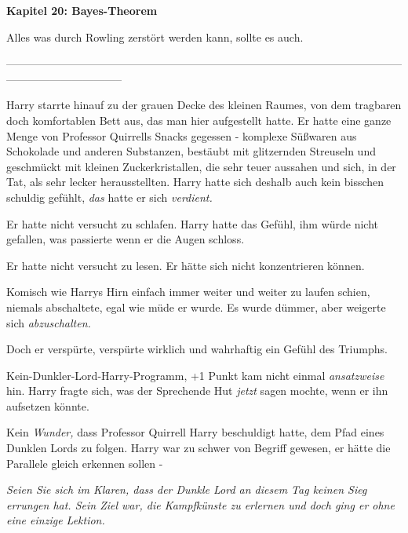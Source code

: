 

\hypertarget{bayes-theorem}{%

\textbf{Kapitel 20: Bayes-Theorem\\ }

Alles was durch Rowling zerstört werden kann, sollte es auch.

--------------------------------------------------------------------------------------------------------------------------------------------

Harry starrte hinauf zu der grauen Decke des kleinen Raumes, von dem tragbaren doch komfortablen Bett aus, das man hier aufgestellt hatte. Er hatte eine ganze Menge von Professor Quirrells Snacks gegessen - komplexe Süßwaren aus Schokolade und anderen Substanzen, bestäubt mit glitzernden Streuseln und geschmückt mit kleinen Zuckerkristallen, die sehr teuer aussahen und sich, in der Tat, als sehr lecker herausstellten. Harry hatte sich deshalb auch kein bisschen schuldig gefühlt, \emph{das} hatte er sich \emph{verdient.}

Er hatte nicht versucht zu schlafen. Harry hatte das Gefühl, ihm würde nicht gefallen, was passierte wenn er die Augen schloss.

Er hatte nicht versucht zu lesen. Er hätte sich nicht konzentrieren können.

Komisch wie Harrys Hirn einfach immer weiter und weiter zu laufen schien, niemals abschaltete, egal wie müde er wurde. Es wurde dümmer, aber weigerte sich \emph{abzuschalten.}

Doch er verspürte, verspürte wirklich und wahrhaftig ein Gefühl des Triumphs.

Kein-Dunkler-Lord-Harry-Programm, +1 Punkt kam nicht einmal \emph{ansatzweise} hin. Harry fragte sich, was der Sprechende Hut \emph{jetzt} sagen mochte, wenn er ihn aufsetzen könnte.

Kein \emph{Wunder,} dass Professor Quirrell Harry beschuldigt hatte, dem Pfad eines Dunklen Lords zu folgen. Harry war zu schwer von Begriff gewesen, er hätte die Parallele gleich erkennen sollen -

\emph{Seien Sie sich im Klaren, dass der Dunkle Lord an diesem Tag keinen Sieg errungen hat. Sein Ziel war, die Kampfkünste zu erlernen und doch ging er ohne eine einzige Lektion.}

}
